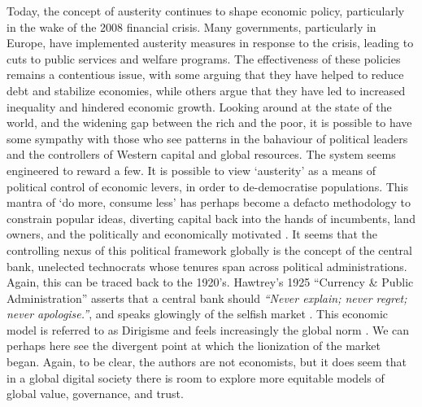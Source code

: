 Today, the concept of austerity continues to shape economic policy, particularly in the wake of the 2008 financial crisis. Many governments, particularly in Europe, have implemented austerity measures in response to the crisis, leading to cuts to public services and welfare programs. The effectiveness of these policies remains a contentious issue, with some arguing that they have helped to reduce debt and stabilize economies, while others argue that they have led to increased inequality and hindered economic growth. Looking around at the state of the world, and the widening gap between the rich and the poor, it is possible to have some sympathy with those who see patterns in the bahaviour of political leaders and the controllers of Western capital and global resources. The system seems engineered to reward a few. It is possible to view `austerity' as a means of political control of economic levers, in order to de-democratise populations. This mantra of `do more, consume less' has perhaps become a defacto methodology to constrain popular ideas, diverting capital back into the hands of incumbents, land owners, and the politically and economically motivated \cite{mattei2022capital}. It seems that the controlling nexus of this political framework globally is the concept of the central bank, unelected technocrats whose tenures span across political administrations. Again, this can be traced back to the 1920's. Hawtrey’s 1925 ``Currency \& Public Administration'' asserts that a central bank should \textit{``Never explain; never regret; never apologise.''}, and speaks glowingly of the selfish market \cite{hawtrey1925currency}. This economic model is referred to as Dirigisme and feels increasingly the global norm \cite{balassa2013theory}.  We can perhaps here see the divergent point at which the lionization of the market began. Again, to be clear, the authors are not economists, but it does seem that in a global digital society there is room to explore more equitable models of global value, governance, and trust.
